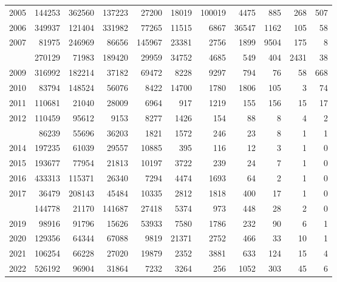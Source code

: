 \documentclass[
]{article}
\begin{document}
\begin{longtable}[t]{lrrrrrrrrrr}
2005 & 144253 & 362560 & 137223 & 27200 & 18019 & 100019 & 4475 & 885 & 268 & 507\\
2006 & 349937 & 121404 & 331982 & 77265 & 11515 & 6867 & 36547 & 1162 & 105 & 58\\
2007 & 81975 & 246969 & 86656 & 145967 & 23381 & 2756 & 1899 & 9504 & 175 & 8\\
\addlinespace
2008 & 270129 & 71983 & 189420 & 29959 & 34752 & 4685 & 549 & 404 & 2431 & 38\\
2009 & 316992 & 182214 & 37182 & 69472 & 8228 & 9297 & 794 & 76 & 58 & 668\\
2010 & 83794 & 148524 & 56076 & 8422 & 14700 & 1780 & 1806 & 105 & 3 & 74\\
2011 & 110681 & 21040 & 28009 & 6964 & 917 & 1219 & 155 & 156 & 15 & 17\\
2012 & 110459 & 95612 & 9153 & 8277 & 1426 & 154 & 88 & 8 & 4 & 2\\
\addlinespace
2013 & 86239 & 55696 & 36203 & 1821 & 1572 & 246 & 23 & 8 & 1 & 1\\
2014 & 197235 & 61039 & 29557 & 10885 & 395 & 116 & 12 & 3 & 1 & 0\\
2015 & 193677 & 77954 & 21813 & 10197 & 3722 & 239 & 24 & 7 & 1 & 0\\
2016 & 433313 & 115371 & 26340 & 7294 & 4474 & 1693 & 64 & 2 & 1 & 0\\
2017 & 36479 & 208143 & 45484 & 10335 & 2812 & 1818 & 400 & 17 & 1 & 0\\
\addlinespace
2018 & 144778 & 21170 & 141687 & 27418 & 5374 & 973 & 448 & 28 & 2 & 0\\
2019 & 98916 & 91796 & 15626 & 53933 & 7580 & 1786 & 232 & 90 & 6 & 1\\
2020 & 129356 & 64344 & 67088 & 9819 & 21371 & 2752 & 466 & 33 & 10 & 1\\
2021 & 106254 & 66228 & 27020 & 19879 & 2352 & 3881 & 633 & 124 & 15 & 4\\
2022 & 526192 & 96904 & 31864 & 7232 & 3264 & 256 & 1052 & 303 & 45 & 6\\*
\end{longtable}
\end{document}
